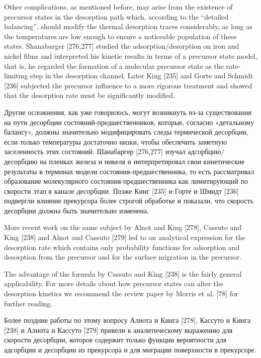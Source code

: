 \documentclass[11pt]{article}
\begin{document}
    Other complications, as mentioned before, may arise from the existence
of precursor states in the desorption path which, according to the
``detailed balancing'', should modify the thermal desorption traces
considerably, as long as the temperatures are low enough to ensure a
noticeable population of these states. Shanabarger {[}276,277{]} studied
the adsorption/desorption on iron and nickel films and interpreted his
kinetic results in terms of a precursor state model, that is, he
regarded the formation of a molecular precursor state as the
rate-limiting step in the desorption channel. Later King {[}235{]} and
Gorte and Schmidt {[}236{]} subjected the precursor influence to a more
rigorous treatment and showed that the desorption rate must be
significantly modified.

    Другие осложнения, как уже говорилось, могут возникнуть из-за
существования на пути десорбции состояний-предшественников, которые,
согласно «детальному балансу», должны значительно модифицировать следы
термической десорбции, если только температуры достаточно низки, чтобы
обеспечить заметную заселенность этих состояний. Шанабаргер
{[}276,277{]} изучал адсорбцию/десорбцию на пленках железа и никеля и
интерпретировал свои кинетические результаты в терминах модели
состояния-предшественника, то есть рассматривал образование
молекулярного состояния-предшественника как лимитирующий по скорости
этап в канале десорбции. Позже Кинг {[}235{]} и Горте и Шмидт {[}236{]}
подвергли влияние прекурсора более строгой обработке и показали, что
скорость десорбции должна быть значительно изменена.

    More recent work on the same subject by Alnot and King {[}278{]},
Cassuto and King {[}238{]} and Alnot and Cassuto {[}279{]} led to an
analytical expression for the desorption rate which contains only
probability functions for adsorption and desorption from the precursor
and for the surface migration in the precursor.

The advantage of the formula by Cassuto and King {[}238{]} is the fairly
general applicability. For more details about how precursor states can
alter the desorption kinetics we recommend the review paper by Morris et
al. {[}78{]} for further reading.

    Более поздние работы по этому вопросу Алнота и Кинга {[}278{]}, Кассуто
и Кинга {[}238{]} и Алнота и Кассуто {[}279{]} привели к аналитическому
выражению для скорости десорбции, которое содержит только функции
вероятности для адсорбции и десорбции из прекурсора и для миграции
поверхности в прекурсоре.
\end{document}
